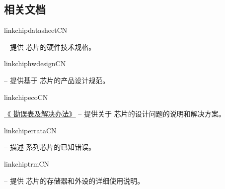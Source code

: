 
{%


\vspace{-0.5em}
\begin{minipage}{\textwidth}

\subsection*{相关文档}

\begin{itemize}
  \ifcsname linkchipdatasheetCN\endcsname%
    {%
      \item \doclinkcdCN{} --
        {\small 提供 \chipseries{} 芯片的硬件技术规格。}%
    }%
  \fi%

  \ifcsname linkchiphwdesignCN\endcsname%
    {%
      \item \doclinkhdgCN{} --
        {\small 提供基于 \chipseries{} 芯片的产品设计规范。}%
    }%
  \fi%

  \ifcsname linkchipecoCN\endcsname%
    \item \href{\linkprefix\linkchipecoCN}{《\chipseries{} 勘误表及解决办法》} --
        {\small 提供关于 \chipseries{} 芯片的设计问题的说明和解决方案。}
  \fi%

  \ifcsname linkchiperrataCN\endcsname%
    {%
    \item \doclinkerrataCN{} --
        {\small 描述 \chipseries{} 系列芯片的已知错误。}
    }%
  \fi%

  \ifcsname linkchiptrmCN\endcsname%
    {%
      \item \doclinktrmCN{} --
        {\small 提供 \chipseries{} 芯片的存储器和外设的详细使用说明。}%
    }%
  \fi%


\end{itemize}
\end{minipage}}
